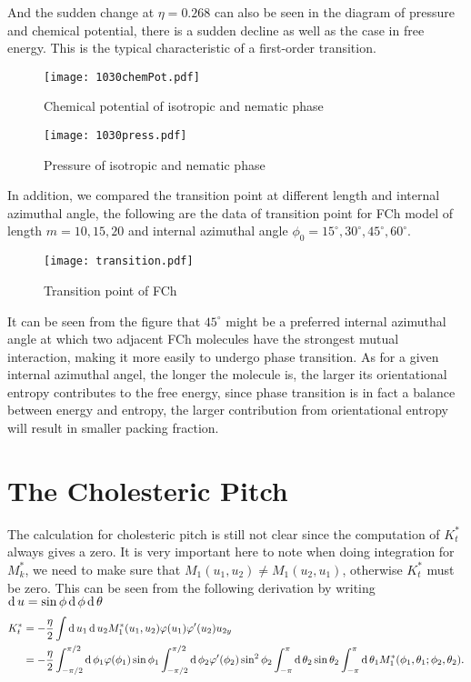 And the sudden change at $\eta=0.268$ can also be seen in the diagram of pressure and chemical potential, there is a sudden decline as well as the case in free energy. This is the typical characteristic of a first-order transition.
\begin{figure}[H]
	\begin{minipage}{0.5\textwidth}
		\centering
		\texttt{[image: 1030chemPot.pdf]}
		\caption{Chemical potential of isotropic and nematic phase}
		\label{fig:chemPot}
	\end{minipage}\hfill
	\begin{minipage}{0.5\textwidth}
 		\centering
 		\texttt{[image: 1030press.pdf]}
 		\caption{Pressure of isotropic and nematic phase}
 		\label{fig:press}
 	\end{minipage}
\end{figure}

In addition, we compared the transition point at different length and internal azimuthal angle, the following are the data of transition point for FCh model of length $m=10,15,20$ and internal azimuthal angle $\phi_0=15^\circ, 30^\circ, 45^\circ, 60^\circ$.

\begin{figure}[H]
 	\centering
 	\texttt{[image: transition.pdf]} \\
	\caption[Schematic of coordinates]{Transition point of FCh}
	\label{fig:tran}
\end{figure}

It can be seen from the figure that $45^\circ$ might be a preferred internal azimuthal angle at which two adjacent FCh molecules have the strongest mutual interaction, making it more easily to undergo phase transition. As for a given internal azimuthal angel, the longer the molecule is, the larger its orientational entropy contributes to the free energy, since phase transition is in fact a balance between energy and entropy, the larger contribution from orientational entropy will result in smaller packing fraction.

\section{The Cholesteric Pitch}
The calculation for cholesteric pitch is still not clear since the computation of $K_t^*$ always gives a zero. It is very important here to note when doing integration for $M_k^*$, we need to make sure that $M_1(u_1,u_2)\neq M_1(u_2,u_1)$, otherwise $K_t^*$ must be zero. This can be seen from the following derivation by writing $\operatorname{d}u=\sin\phi\operatorname{d}\phi\operatorname{d}\theta$
\begin{equation}
	\begin{split}
		K_t^*&=-\frac{\eta}{2}\int\operatorname{d}u_1\operatorname{d}u_2M_1^*(u_1,u_2)\varphi(u_1)\varphi'(u_2)u_{2y}\\
		&=-\frac{\eta}{2}\int_{-\pi/2}^{\pi/2}\operatorname{d}\phi_1\varphi(\phi_1)\sin\phi_1\int_{-\pi/2}^{\pi/2}\operatorname{d}\phi_2\varphi'(\phi_2)\sin^2\phi_2\int_{-\pi}^{\pi}\operatorname{d}\theta_2\sin\theta_2\int_{-\pi}^{\pi}\operatorname{d}\theta_1M_1^*(\phi_1,\theta_1;\phi_2,\theta_2).
	\end{split}
\end{equation}

